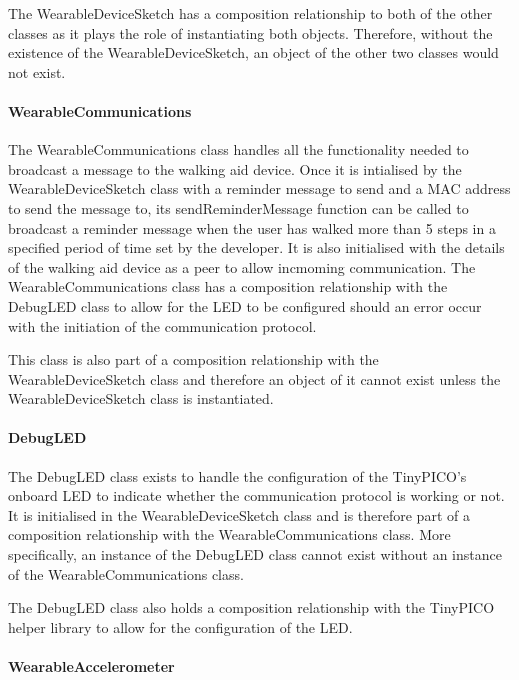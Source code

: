                     The WearableDeviceSketch has a composition relationship to both of the other classes as it plays the role of instantiating both objects. Therefore, without the existence of the WearableDeviceSketch, an object of the other two classes would not exist.

                \paragraph{WearableCommunications}\mbox{}

                    The WearableCommunications class handles all the functionality needed to broadcast a message to the walking aid device. Once it is intialised by the WearableDeviceSketch class with a reminder message to send and a MAC address to send the message to, its sendReminderMessage function can be called to broadcast a reminder message when the user has walked more than 5 steps in a specified period of time set by the developer. It is also initialised with the details of the walking aid device as a peer to allow incmoming communication. The WearableCommunications class has a composition relationship with the DebugLED class to allow for the LED to be configured should an error occur with the initiation of the communication protocol.

                    This class is also part of a composition relationship with the WearableDeviceSketch class and therefore an object of it cannot exist unless the WearableDeviceSketch class is instantiated.

                \paragraph{DebugLED}\mbox{}

                    The DebugLED class exists to handle the configuration of the TinyPICO's onboard LED to indicate whether the communication protocol is working or not. It is initialised in the WearableDeviceSketch class and is therefore part of a composition relationship with the WearableCommunications class. More specifically, an instance of the DebugLED class cannot exist without an instance of the WearableCommunications class.

                    The DebugLED class also holds a composition relationship with the TinyPICO helper library to allow for the configuration of the LED.

                \paragraph{WearableAccelerometer}\mbox{}

